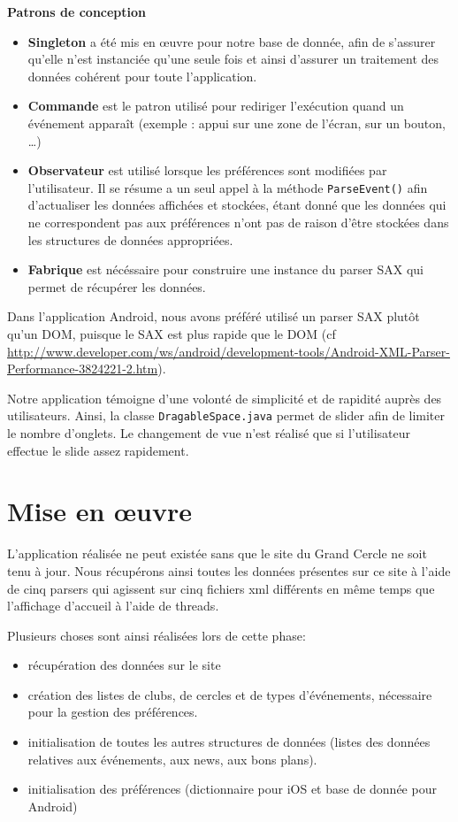\documentclass[a4paper, 11pt]{article}
\begin{document}
{\bf Patrons de conception}

\begin{itemize}
	\item {\bf Singleton} a été mis en œuvre pour notre base de donnée, afin de s'assurer qu'elle n'est instanciée qu'une seule fois et ainsi d'assurer un traitement des données cohérent pour toute l'application.\\
	\item {\bf Commande} est le patron utilisé pour rediriger l'exécution quand un événement apparaît (exemple : appui sur une zone de l'écran, sur un bouton, \dots)\\
	\item {\bf Observateur} est utilisé lorsque les préférences sont modifiées par l'utilisateur. Il se résume a un seul appel à la méthode \texttt{ParseEvent()} afin d'actualiser les données affichées et stockées, étant donné que les données qui ne correspondent pas aux préférences n'ont pas de raison d'être stockées dans les structures de données appropriées.
	\item {\bf Fabrique} est nécéssaire pour construire une instance du parser SAX qui permet de récupérer les données.
\end{itemize}
Dans l'application Android, nous avons préféré utilisé un parser SAX plutôt qu'un DOM, puisque le SAX est plus rapide que le DOM (cf \href{http://www.developer.com/ws/android/development-tools/Android-XML-Parser-Performance-3824221-2.htm}{http://www.developer.com/ws/android/development-tools/Android-XML-Parser-Performance-3824221-2.htm}).

Notre application témoigne d'une volonté de simplicité et de rapidité auprès des utilisateurs. Ainsi, la classe \texttt{DragableSpace.java} permet de \og slider \fg afin de limiter le nombre d'onglets. Le changement de vue n'est réalisé que si l'utilisateur effectue le slide assez rapidement.

\section{Mise en œuvre}

L'application réalisée ne peut existée sans que le site du Grand Cercle ne soit tenu à jour. Nous récupérons ainsi toutes les données présentes sur ce site à l'aide de cinq parsers qui agissent sur cinq fichiers xml différents en même temps que l'affichage d'accueil à l'aide de threads.

\noindent Plusieurs choses sont ainsi réalisées lors de cette phase:
\begin{itemize}
\item récupération des données sur le site
\item création des listes de clubs, de cercles et de types d'événements, nécessaire pour la gestion des préférences.
\item initialisation de toutes les autres structures de données (listes des données relatives aux événements, aux news, aux bons plans).
\item initialisation des préférences (dictionnaire pour iOS et base de donnée pour Android)
\end{itemize}
\end{document}
